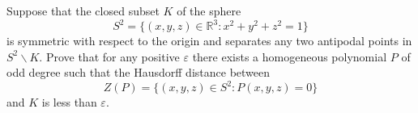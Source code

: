 Suppose that the closed subset $K$ of the sphere
$$S^2=\{ (x,y,z)\in \mathbb{R}^3\colon x^2+y^2+z^2=1 \}$$is symmetric with respect to the origin and separates any two antipodal points in $S^2 \backslash K$. Prove that for any positive $\varepsilon$ there exists a homogeneous polynomial $P$ of odd degree such that the Hausdorff distance between
$$Z(P)=\{ (x,y,z)\in S^2 \colon P(x,y,z)=0\}$$and $K$ is less than $\varepsilon$.